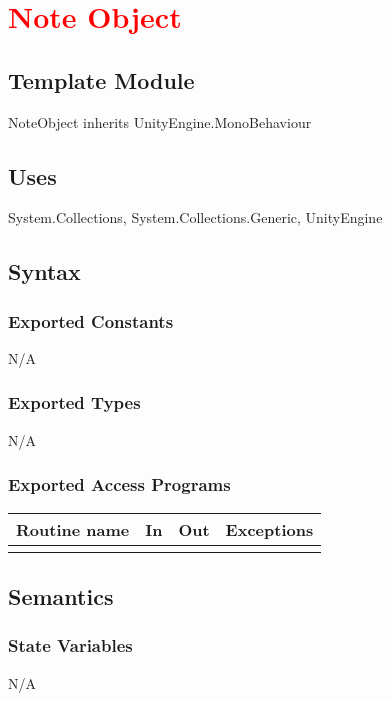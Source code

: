 \documentclass[12pt]{article}
\begin{document}
\newpage
\section{\textcolor{red}{Note Object}}

\subsection{Template Module}
NoteObject inherits UnityEngine.MonoBehaviour

\subsection {Uses}
System.Collections, System.Collections.Generic, UnityEngine

\subsection {Syntax}

\subsubsection {Exported Constants}
N/A
\subsubsection {Exported Types}
N/A

\subsubsection {Exported Access Programs}

\begin{tabular}{| l | l | l | l |}
\hline
\textbf{Routine name} & \textbf{In} & \textbf{Out} & \textbf{Exceptions}\\
\hline
& & &\\
\hline
\end{tabular}

\subsection {Semantics}

\subsubsection {State Variables}
N/A
\end{document}
